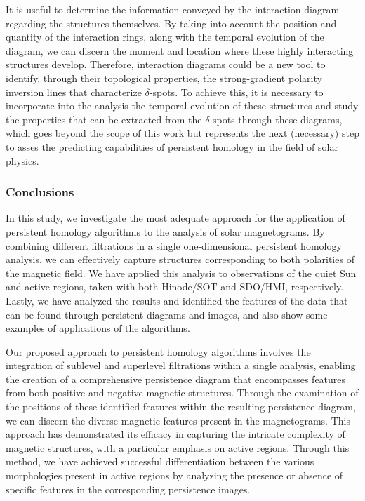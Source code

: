 \documentclass[12pt]{mythesis}
\begin{document}
It is useful to determine the information conveyed by the interaction diagram regarding the structures themselves. By taking into account the position and quantity of the interaction rings, along with the temporal evolution of the diagram, we can discern the moment and location where these highly interacting structures develop. Therefore, interaction diagrams could be a new tool to identify, through their topological properties, the strong-gradient polarity inversion lines that characterize $\delta$-spots. To achieve this, it is necessary to incorporate into the analysis the temporal evolution of these structures and study the properties that can be extracted from the $\delta$-spots through these diagrams, which goes beyond the scope of this work but represents the next (necessary) step to asses the predicting capabilities of persistent homology in the field of solar physics.

\subsubsection{Conclusions}
In this study, we investigate the most adequate approach for the application of persistent homology algorithms to the analysis of solar magnetograms. By combining different filtrations in a single one-dimensional persistent homology analysis, we can effectively capture structures corresponding to both polarities of the magnetic field. We have applied this analysis to observations of the quiet Sun and active regions, taken with both Hinode/SOT and SDO/HMI, respectively. Lastly, we have analyzed the results and identified the features of the data that can be found through persistent diagrams and images, and also show some examples of applications of the algorithms. 

Our proposed approach to persistent homology algorithms involves the integration of sublevel and superlevel filtrations within a single analysis, enabling the creation of a comprehensive persistence diagram that encompasses features from both positive and negative magnetic structures. Through the examination of the positions of these identified features within the resulting persistence diagram, we can discern the diverse magnetic features present in the magnetograms. This approach has demonstrated its efficacy in capturing the intricate complexity of magnetic structures, with a particular emphasis on active regions. Through this method, we have achieved successful differentiation between the various morphologies present in active regions by analyzing the presence or absence of specific features in the corresponding persistence images. 
\end{document}

